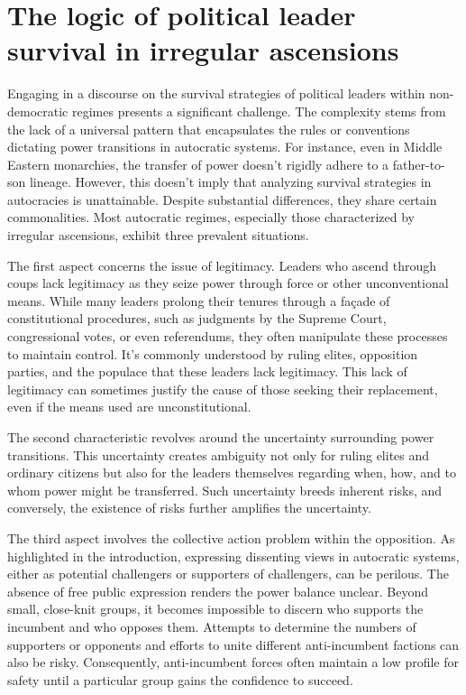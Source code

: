 \documentclass[
  12pt,
  a4paper,
  12pt]{article}
\begin{document}
\hypertarget{the-logic-of-political-leader-survival-in-irregular-ascensions}{%
\section{The logic of political leader survival in irregular
ascensions}\label{the-logic-of-political-leader-survival-in-irregular-ascensions}}

Engaging in a discourse on the survival strategies of political leaders
within non-democratic regimes presents a significant challenge. The
complexity stems from the lack of a universal pattern that encapsulates
the rules or conventions dictating power transitions in autocratic
systems. For instance, even in Middle Eastern monarchies, the transfer
of power doesn't rigidly adhere to a father-to-son lineage. However,
this doesn't imply that analyzing survival strategies in autocracies is
unattainable. Despite substantial differences, they share certain
commonalities. Most autocratic regimes, especially those characterized
by irregular ascensions, exhibit three prevalent situations.

The first aspect concerns the issue of legitimacy. Leaders who ascend
through coups lack legitimacy as they seize power through force or other
unconventional means. While many leaders prolong their tenures through a
façade of constitutional procedures, such as judgments by the Supreme
Court, congressional votes, or even referendums, they often manipulate
these processes to maintain control. It's commonly understood by ruling
elites, opposition parties, and the populace that these leaders lack
legitimacy. This lack of legitimacy can sometimes justify the cause of
those seeking their replacement, even if the means used are
unconstitutional.

The second characteristic revolves around the uncertainty surrounding
power transitions. This uncertainty creates ambiguity not only for
ruling elites and ordinary citizens but also for the leaders themselves
regarding when, how, and to whom power might be transferred. Such
uncertainty breeds inherent risks, and conversely, the existence of
risks further amplifies the uncertainty.

The third aspect involves the collective action problem within the
opposition. As highlighted in the introduction, expressing dissenting
views in autocratic systems, either as potential challengers or
supporters of challengers, can be perilous. The absence of free public
expression renders the power balance unclear. Beyond small, close-knit
groups, it becomes impossible to discern who supports the incumbent and
who opposes them. Attempts to determine the numbers of supporters or
opponents and efforts to unite different anti-incumbent factions can
also be risky. Consequently, anti-incumbent forces often maintain a low
profile for safety until a particular group gains the confidence to
succeed.
\end{document}
